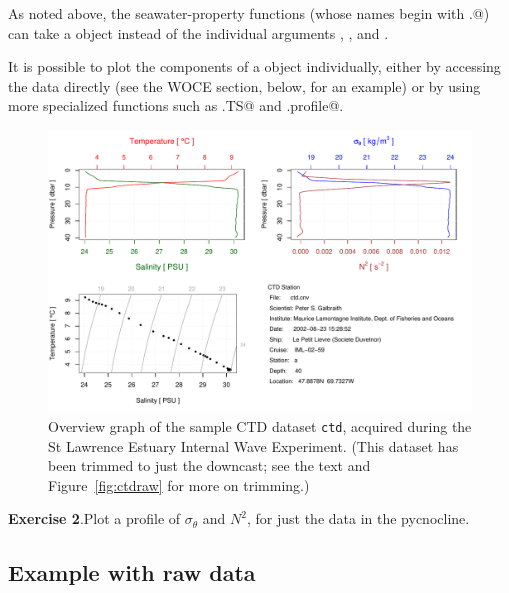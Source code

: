 \documentclass{article}
\newcommand{\workedexercise}[2]{
	\vspace{2ex plus 2ex minus 1ex}
	\begin{boxedminipage}[c]{0.95\linewidth}
		{\textbf{Exercise #1}.\hspace{1em}#2}
	\end{boxedminipage}
	\vspace{2ex plus 2ex minus 1ex}
}
\begin{document}
As noted above, the seawater-property functions (whose names begin with
\verb@sw.@) can take a \verb@ctd@ object instead of the individual arguments
\verb@S@, \verb@t@, and \verb@p@.

It is possible to plot the components of a \verb@ctd@ object individually,
either by accessing the data directly (see the WOCE section, below, for an
example) or by using more specialized functions such as
\verb@plot.TS@ and \verb@plot.profile@.
\begin{figure}
\begin{center}
\includegraphics{oce-ctdfig}
\end{center}
\caption{Overview graph of the sample CTD dataset \texttt{ctd}, acquired during
the St Lawrence Estuary Internal Wave Experiment.  (This dataset has been
trimmed to just the downcast; see the text and Figure~\ref{fig:ctdraw} for more
on trimming.)}
\label{fig:ctd}
\end{figure}

\workedexercise{2}{Plot a profile of $\sigma_\theta$ and $N^2$, for just the data in the pycnocline.}

\subsection{Example with raw data}
\end{document}
